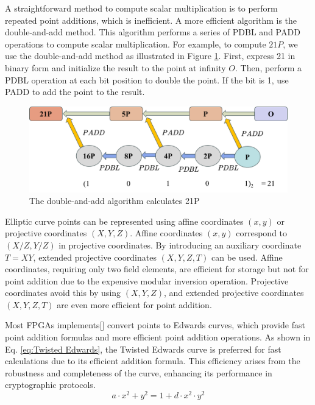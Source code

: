\documentclass[journal=tches,final]{iacrtrans}
\begin{document}
A straightforward method to compute scalar multiplication is to perform repeated point additions, which is inefficient. A more efficient algorithm is the double-and-add method. This algorithm performs a series of PDBL and PADD operations to compute scalar multiplication. For example, to compute \( 21P \), we use the double-and-add method as illustrated in Figure \ref{fig:double-add}. First, express 21 in binary form and initialize the result to the point at infinity \( O \). Then, perform a PDBL operation at each bit position to double the point. If the bit is 1, use PADD to add the point to the result.

\begin{figure}[h]
\centering
\includegraphics[width=1\linewidth]{image/double-and-add.png}
\caption{The double-and-add algorithm calculates 21P}
\label{fig:double-add}
\end{figure}

Elliptic curve points can be represented using affine coordinates $(x, y)$ or projective coordinates $(X, Y, Z)$. Affine coordinates $(x, y)$ correspond to $(X / Z, Y / Z)$ in projective coordinates. By introducing an auxiliary coordinate $T = XY$, extended projective coordinates $(X, Y, Z, T)$ can be used. Affine coordinates, requiring only two field elements, are efficient for storage but not for point addition due to the expensive modular inversion operation. Projective coordinates avoid this by using $(X, Y, Z)$, and extended projective coordinates $(X, Y, Z, T)$ are even more efficient for point addition.

Most FPGAs implements[] convert points to Edwards curves, which provide fast point addition formulas and more efficient point addition operations. As shown in Eq. \ref{eq:Twisted Edwards}, the Twisted Edwards curve is preferred for fast calculations due to its efficient addition formula. This efficiency arises from the robustness and completeness of the curve, enhancing its performance in cryptographic protocols.
\begin{equation}
a \cdot x^2+y^2=1+d \cdot x^2 \cdot y^2
\label{eq:Twisted Edwards}
\end{equation}
\end{document}
